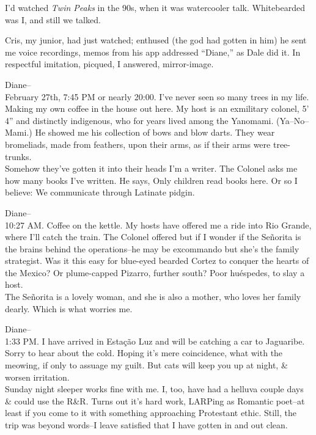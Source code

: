 I'd watched \textit{Twin Peaks} in the 90s, when it was watercooler talk. Whitebearded was I, and still we talked. 

Cris, my junior, had just watched; enthused (the god had gotten in him) he sent me voice recordings, memos from his app addressed ``Diane,'' as Dale did it. In respectful imitation, picqued, I answered, mirror-image.

Diane-- \\
February 27th, 7:45 PM or nearly 20:00. I've never seen so many trees in my life. \\
Making my own coffee in the house out here. My host is an exmilitary colonel, 5' 4'' and distinctly indigenous, who for years lived among the Yanomami. (Ya--No--Mami.) He showed me his collection of bows and blow darts. They wear bromeliads, made from feathers, upon their arms, as if their arms were tree-trunks. \\
Somehow they've gotten it into their heads I'm a writer. The Colonel asks me how many books I've written. He says, Only children read books here. Or so I believe: We communicate through Latinate pidgin. 

Diane-- \\
10:27 AM. Coffee on the kettle. My hosts have offered me a ride into Rio Grande, where I'll catch the train. The Colonel offered but if I wonder if the Señorita is the brains behind the operations--he may be excommando but she's the family strategist. Was it this easy for blue-eyed bearded Cortez to conquer the hearts of the Mexico? Or plume-capped Pizarro, further south? Poor huéspedes, to slay a host. \\
The Señorita is a lovely woman, and she is also a mother, who loves her family dearly. Which is what worries me. 

Diane-- \\
1:33 PM. I have arrived in Estação Luz and will be catching a car to Jaguaribe. Sorry to hear about the cold. Hoping it's mere coincidence, what with the meowing, if only to assuage my guilt. But cats will keep you up at night, \& worsen irritation. \\
Sunday night sleeper works fine with me. I, too, have had a helluva couple days \& could use the R\&R. Turns out it's hard work, LARPing as Romantic poet--at least if you come to it with something approaching Protestant ethic. Still, the trip was beyond words--I leave satisfied that I have gotten in and out clean.